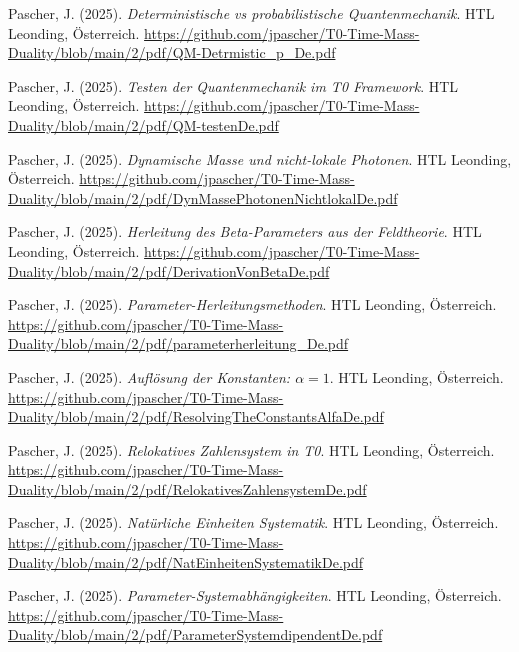 \documentclass{article}
\begin{document}
\begin{thebibliography}{99}
		Pascher, J. (2025).
		\textit{Deterministische vs probabilistische Quantenmechanik}.
		HTL Leonding, Österreich.
		\url{https://github.com/jpascher/T0-Time-Mass-Duality/blob/main/2/pdf/QM-Detrmistic_p_De.pdf}
		
		Pascher, J. (2025).
		\textit{Testen der Quantenmechanik im T0 Framework}.
		HTL Leonding, Österreich.
		\url{https://github.com/jpascher/T0-Time-Mass-Duality/blob/main/2/pdf/QM-testenDe.pdf}
		
		Pascher, J. (2025).
		\textit{Dynamische Masse und nicht-lokale Photonen}.
		HTL Leonding, Österreich.
		\url{https://github.com/jpascher/T0-Time-Mass-Duality/blob/main/2/pdf/DynMassePhotonenNichtlokalDe.pdf}
		
		
		Pascher, J. (2025).
		\textit{Herleitung des Beta-Parameters aus der Feldtheorie}.
		HTL Leonding, Österreich.
		\url{https://github.com/jpascher/T0-Time-Mass-Duality/blob/main/2/pdf/DerivationVonBetaDe.pdf}
		
		Pascher, J. (2025).
		\textit{Parameter-Herleitungsmethoden}.
		HTL Leonding, Österreich.
		\url{https://github.com/jpascher/T0-Time-Mass-Duality/blob/main/2/pdf/parameterherleitung_De.pdf}
		
		Pascher, J. (2025).
		\textit{Auflösung der Konstanten: $\alpha = 1$}.
		HTL Leonding, Österreich.
		\url{https://github.com/jpascher/T0-Time-Mass-Duality/blob/main/2/pdf/ResolvingTheConstantsAlfaDe.pdf}
		
		Pascher, J. (2025).
		\textit{Relokatives Zahlensystem in T0}.
		HTL Leonding, Österreich.
		\url{https://github.com/jpascher/T0-Time-Mass-Duality/blob/main/2/pdf/RelokativesZahlensystemDe.pdf}
		
		Pascher, J. (2025).
		\textit{Natürliche Einheiten Systematik}.
		HTL Leonding, Österreich.
		\url{https://github.com/jpascher/T0-Time-Mass-Duality/blob/main/2/pdf/NatEinheitenSystematikDe.pdf}
		
		Pascher, J. (2025).
		\textit{Parameter-Systemabhängigkeiten}.
		HTL Leonding, Österreich.
		\url{https://github.com/jpascher/T0-Time-Mass-Duality/blob/main/2/pdf/ParameterSystemdipendentDe.pdf}
		

\end{thebibliography}
\end{document}
